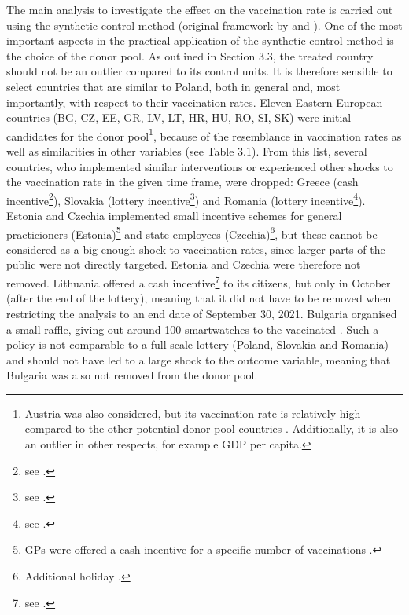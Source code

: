 \documentclass{scrbook}
\begin{document}
The main analysis to investigate the effect on the vaccination rate is
carried out using the synthetic control method (original framework by
\textcite{abadie_economic_2003} and \textcite{abadie_synthetic_2010}).
One of the most important aspects in the practical application of the
synthetic control method is the choice of the donor pool. As outlined in
Section 3.3, the treated country should not be an outlier compared to
its control units. It is therefore sensible to select countries that are
similar to Poland, both in general and, most importantly, with respect
to their vaccination rates. Eleven Eastern European countries (BG, CZ,
EE, GR, LV, LT, HR, HU, RO, SI, SK) were initial candidates for the
donor
pool\footnote{Austria was also considered, but its vaccination rate is relatively high compared to the other potential donor pool countries \parencite{mathieu_global_2021}. Additionally, it is also an outlier in other respects, for example GDP per capita.},
because of the resemblance in vaccination rates as well as similarities
in other variables (see Table 3.1). From this list, several countries,
who implemented similar interventions or experienced other shocks to the
vaccination rate in the given time frame, were dropped: Greece (cash
incentive\footnote{see \textcite{koutantou_greece_2021}.}), Slovakia
(lottery incentive\footnote{see \textcite{lopatka_slovaks_2021}.}) and
Romania (lottery
incentive\footnote{see \textcite{health_ministry_of_romania_press_2021}.}).
Estonia and Czechia implemented small incentive schemes for general
practicioners
(Estonia)\footnote{GPs were offered a cash incentive for a specific number of vaccinations \parencite{baltic_news_network_estonia_2021}.}
and state employees
(Czechia)\footnote{Additional holiday \parencite{euronews_czech_2021}.},
but these cannot be considered as a big enough shock to vaccination
rates, since larger parts of the public were not directly targeted.
Estonia and Czechia were therefore not removed. Lithuania offered a cash
incentive\footnote{see \textcite{lithuanian_national_radio_and_television_lithuanian_2021}.}
to its citizens, but only in October (after the end of the lottery),
meaning that it did not have to be removed when restricting the analysis
to an end date of September 30, 2021. Bulgaria organised a small raffle,
giving out around 100 smartwatches to the vaccinated
\parencite{radio_bulgaria_bulgarias_2021}. Such a policy is not
comparable to a full-scale lottery (Poland, Slovakia and Romania) and
should not have led to a large shock to the outcome variable, meaning
that Bulgaria was also not removed from the donor pool.
\end{document}
